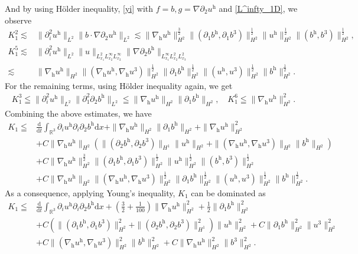 \documentclass[11pt]{amsart}
\theoremstyle{definition}
\newcommand{\R}{\mathbb{R}}
\newcommand{\h}{\mathrm{h}}
\newcommand{\nablah}{\nabla_{\mathrm{h}}}
\numberwithin{equation}{section}
\begin{document}
And by using H\"{o}lder inequality, \eqref{yi} with $f=b,g=\nabla \partial_{2}u^\h$ and \eqref{L^infty_1D}, we observe
\begin{align*}
	K^{2}_{1}\lesssim&\|\partial_{i}^2u^\h\|_{L^{2}}\|b\cdot \nabla \partial_{2}u^\h\|_{L^{2}}
	\lesssim \|\nablah u^\h\|_{H^{2}}^\frac32\|(\partial_1b^\h,\partial_1b^3)\|_{H^2}^\frac12\|u^\h\|_{H^2}^\frac12\|(b^\h,b^3)\|_{H^2}^\frac12,\\
	K^{5}_{1}\lesssim&\|\partial_{i}^2u^\h\|_{L^{2}}\|u\|_{L^2_{x_1}L^\infty_{x_2}L^\infty_{x_2}}\| \nabla \partial_{2}b^\h\|_{L^\infty_{x_1}L^{2}_{x_2}L^{2}_{x_3}}\\
	\lesssim& \|\nablah u^\h\|_{H^{2}}\|(\nablah u^\h,\nablah u^3)\|_{H^2}^\frac12\|\partial_1b^\h\|_{H^2}^\frac12\|(u^\h,u^3)\|_{H^2}^\frac12\|b^\h\|_{H^2}^\frac12.
\end{align*}
For the remaining terms, using H\"{o}lder inequality again, we get
\begin{align*}
	K^{3}_{1}\leqq \|\partial_{i}^2u^\h\|_{L^{2}}\|\partial_{1}^2\partial_2b^\h\|_{L^{2}}\leqq \|\nablah u^\h\|_{H^{2}}\|\partial_{1}b^\h\|_{H^{2}},\quad 	K^{6}_{1}\leqq\|\nablah u^\h\|_{H^{2}}^2.
\end{align*}
Combining the above estimates, we have
\begin{align}\label{k_1}
	K_{1}\leqq&\frac{\mathrm{d}}{\mathrm{d}t}\int_{\R^3}\partial_{i}u^\h\partial_{i}\partial_{2}b^\h\mathrm{d}x+\|\nablah u^\h\|_{H^{2}}\|\partial_{1}b^\h\|_{H^{2}}+\|\nablah u^\h\|_{H^{2}}^2\nonumber\\
	&+C\|\nabla_{\mathrm{h}}u^\h\|_{H^{2}}\left(\|(\partial_2b^\mathrm{h},\partial_2b^3)\|_{H^{1}}\|u^\h\|_{H^{2}}+\|(\nabla_{\mathrm{h}}u^\h,\nabla_{\mathrm{h}}u^3)\|_{H^{2}}\|b^\h\|_{H^{2}}\right)\nonumber\\
	&+C\|\nablah u^\h\|_{H^{2}}^\frac32\|(\partial_1b^\h,\partial_1b^3)\|_{H^2}^\frac12\|u^\h\|_{H^2}^\frac12\|(b^\h,b^3)\|_{H^2}^\frac12\nonumber\\
	&+C\|\nablah u^\h\|_{H^{2}}\|(\nablah u^\h,\nablah u^3)\|_{H^2}^\frac12\|\partial_1b^\h\|_{H^2}^\frac12\|(u^\h,u^3)\|_{H^2}^\frac12\|b^\h\|_{H^2}^\frac12.
\end{align}
As a consequence, applying Young's inequality, $K_{1}$ can be dominated as
\begin{align}\label{K1}
	K_{1}\leqq&\frac{\mathrm{d}}{\mathrm{d}t}\int_{\R^3}\partial_{i}u^\h\partial_{i}\partial_{2}b^\h\mathrm{d}x+(\frac32+\frac{1}{100})\|\nablah u^\h\|_{H^{2}}^2+\frac12\|\partial_{1}b^\h\|_{H^{2}}^2\nonumber\\
	&+C\left(\|(\partial_1b^\h,\partial_1b^3)\|_{H^2}^2+\|(\partial_2b^\mathrm{h},\partial_2b^3)\|_{H^{1}}^2\right)\|u^\h\|_{H^{2}}^2+C\|\partial_1b^\h\|_{H^2}^2\|u^3\|_{H^2}^2\nonumber\\
	&+C\|(\nabla_{\mathrm{h}}u^\h,\nabla_{\mathrm{h}}u^3)\|_{H^{2}}^2\|b^\h\|_{H^{2}}^2+C\|\nablah u^\h\|_{H^{2}}^2\|b^3\|_{H^2}^2.
\end{align}
\end{document}
